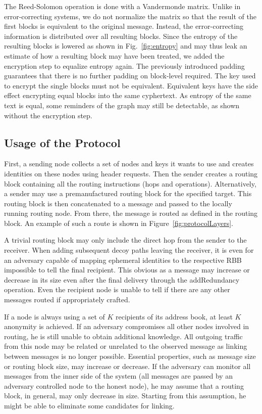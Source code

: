\documentclass[acmsmall, screen, final]{acmart}
\begin{document}
	
	The Reed-Solomon operation is done with a Vandermonde matrix. Unlike in error-correcting systems, we do not normalize the matrix so that the result of the first blocks is equivalent to the original message. Instead, the error-correcting information is distributed over all resulting blocks. Since the entropy of the resulting blocks is lowered as shown in Fig.~\ref{fig:entropy} and may thus leak an estimate of how a resulting block may have been treated, we added the encryption step to equalize entropy again. The previously introduced padding guarantees that there is no further padding on block-level required. The key used to encrypt the single blocks must not be equivalent. Equivalent keys have the side effect encrypting equal blocks into the same cyphertext. As entropy of the same text is equal, some reminders of the graph may still be detectable, as shown without the encryption step.
	
	\subsection{Usage of the Protocol}
	First, a sending node collects a set of nodes and keys it wants to use and creates identities on these nodes using header requests. Then the sender creates a routing block containing all the routing instructions (hops and operations). Alternatively, a sender may use a premanufactured routing block for the specified target. This routing block is then concatenated to a message and passed to the locally running routing node. From there, the message is routed as defined in the routing block. An example of such a route is shown in Figure~\ref{fig:protocolLayers}.
	
	A trivial routing block may only include the direct hop from the sender to the receiver. When adding subsequent decoy paths leaving the receiver, it is even for an adversary capable of mapping ephemeral identities to the respective RBB impossible to tell the final recipient. This obvious as a message may increase or decrease in its size even after the final delivery through the addRedundancy operation. Even the recipient node is unable to tell if there are any other messages routed if appropriately crafted.
	
	If a node is always using a set of $K$ recipients of its address book, at least $K$ anonymity is achieved. If an adversary compromises all other nodes involved in routing, he is still unable to obtain additional knowledge. All outgoing traffic from this node may be related or unrelated to the observed message as linking between messages is no longer possible. Essential properties, such as message size or routing block size, may increase or decrease. If the adversary can monitor all messages from the inner side of the system (all messages are passed by an adversary controlled node to the honest node), he may assume that a routing block, in general, may only decrease in size. Starting from this assumption, he might be able to eliminate some candidates for linking.
	
\end{document}
